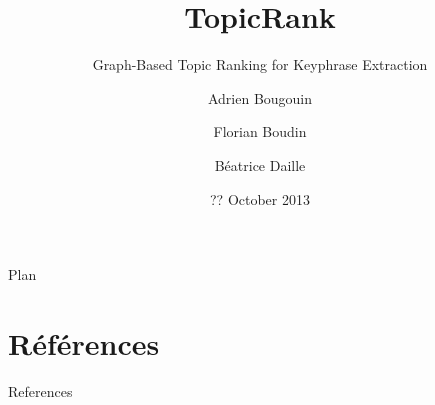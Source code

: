 \documentclass{beamer}
\title{TopicRank}
\subtitle{Graph-Based Topic Ranking for Keyphrase Extraction}
\author{Adrien Bougouin \and Florian Boudin \and Béatrice Daille}
\institute{Université de Nantes, LINA, France}
\date{?? October 2013}
\renewcommand\cite[2][]{\citep[#1]{#2}}
\begin{document}
  \renewcommand*{\theenumii}{\alph{enumii}}
  \renewcommand*{\theenumiii}{\roman{enumiii}}

  \begin{frame}
    \titlepage
  \end{frame}
  \setcounter{framenumber}{0}

  
  
  
  \begin{frame}{Plan}
    \tableofcontents[section]
  \end{frame}
  
  
  
  
  \cite{mihalcea2004textrank}
  \section*{Références}
    \begin{frame}[allowframebreaks]{References}
      \def\newblock{\hskip .11em plus .33em minus .07em}
      
      
    \end{frame}
\end{document}

